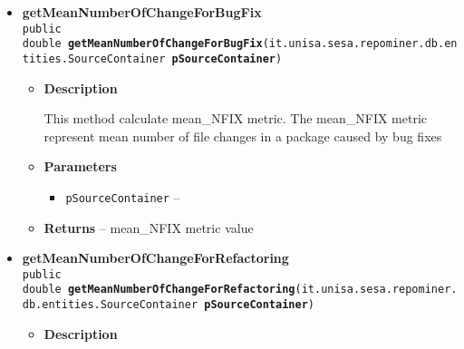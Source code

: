 {{{{{{{\begin{itemize}
{\begin{itemize}
{This method calculate mean\_NCHANGE metric. The mean\_NCHANGE metric represent mean number of file changes in a package
}
\item{
{\bf  Parameters}
  \begin{itemize}
   \item{
\texttt{pSourceContainer} -- }
  \end{itemize}
}%
\item{{\bf  Returns} -- 
mean\_NCHANGE metric value 
}%
\end{itemize}
}%
\item{ 
\hypertarget{it.unisa.sesa.repominer.metrics.PackageMetrics.getMeanNumberOfChangeForBugFix(it.unisa.sesa.repominer.db.entities.SourceContainer)}{{\bf  getMeanNumberOfChangeForBugFix}\\}
\texttt{public double\ {\bf  getMeanNumberOfChangeForBugFix}(\texttt{it.unisa.sesa.repominer.db.entities.SourceContainer} {\bf  pSourceContainer})
\label{it.unisa.sesa.repominer.metrics.PackageMetrics.getMeanNumberOfChangeForBugFix(it.unisa.sesa.repominer.db.entities.SourceContainer)}}%
\begin{itemize}
\item{
{\bf  Description}

This method calculate mean\_NFIX metric. The mean\_NFIX metric represent mean number of file changes in a package caused by bug fixes
}
\item{
{\bf  Parameters}
  \begin{itemize}
   \item{
\texttt{pSourceContainer} -- }
  \end{itemize}
}%
\item{{\bf  Returns} -- 
mean\_NFIX metric value 
}%
\end{itemize}
}%
\item{ 
\hypertarget{it.unisa.sesa.repominer.metrics.PackageMetrics.getMeanNumberOfChangeForRefactoring(it.unisa.sesa.repominer.db.entities.SourceContainer)}{{\bf  getMeanNumberOfChangeForRefactoring}\\}
\texttt{public double\ {\bf  getMeanNumberOfChangeForRefactoring}(\texttt{it.unisa.sesa.repominer.db.entities.SourceContainer} {\bf  pSourceContainer})
\label{it.unisa.sesa.repominer.metrics.PackageMetrics.getMeanNumberOfChangeForRefactoring(it.unisa.sesa.repominer.db.entities.SourceContainer)}}%
\begin{itemize}
\item{
{\bf  Description}

}
\end{itemize}}
\end{itemize}}}}}}}}

